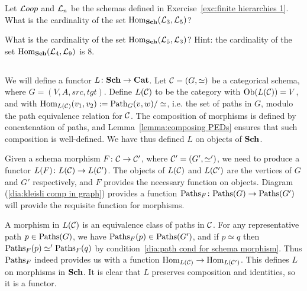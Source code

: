 \documentclass[CT4S-EN-RU]{subfiles}
\begin{document}
\begin{exerciseRUS}\label{exc:finite hierarchies 1}
\end{exerciseRUS}

\begin{exerciseENG}
Let ${\mathcal{L} oop}$ and $\mathcal{L}_n$ be the schemas defined in Exercise~\ref{exc:finite hierarchies 1}.
\sexc What is the cardinality of the set $\textnormal{Hom}_{\mathbf{Sch}}(\mathcal{L}_3,\mathcal{L}_5)$?
\item What is the cardinality of the set $\textnormal{Hom}_{\mathbf{Sch}}(\mathcal{L}_5,\mathcal{L}_3)$? Hint: the cardinality of the set $\textnormal{Hom}_{\mathbf{Sch}}(\mathcal{L}_4,\mathcal{L}_9)$ is 8.
\endsexc
\end{exerciseENG}

\begin{exerciseRUS}
\end{exerciseRUS}


\subsection{}\label{sec:proof of cat=sch}

\begin{constructionENG}
We will define a functor $L\colon{\mathbf{Sch}}\rightarrow{\mathbf{Cat}}$. Let $\mathcal{C}=(G,\simeq)$ be a categorical schema, where $G=(V,A,src,tgt)$. Define $L(\mathcal{C})$ to be the category with $\textnormal{Ob}(L(\mathcal{C}))=V$, and with $\textnormal{Hom}_{L(\mathcal{C})}(v_1,v_2):=\textnormal{Path}_G(v,w)/\simeq$, i.e. the set of paths in $G$, modulo the path equivalence relation for $\mathcal{C}$. The composition of morphisms is defined by concatenation of paths, and Lemma~\ref{lemma:composing PEDs} ensures that such composition is well-defined. We have thus defined $L$ on objects of ${\mathbf{Sch}}$.

Given a schema morphism $F\colon\mathcal{C}\rightarrow\mathcal{C}'$, where $\mathcal{C}'=(G',\simeq')$, we need to produce a functor $L(F)\colon L(\mathcal{C})\rightarrow L(\mathcal{C}')$. The objects of $L(\mathcal{C})$ and $L(\mathcal{C}')$ are the vertices of $G$ and $G'$ respectively, and $F$ provides the necessary function on objects. Diagram (\ref{dia:kleisli comp in graph}) provides a function $\textnormal{Paths}_F\colon\textnormal{Paths}(G)\rightarrow\textnormal{Paths}(G')$ will provide the requisite function for morphisms. 

A morphism in $L(\mathcal{C})$ is an equivalence class of paths in $\mathcal{C}$. For any representative path $p\in\textnormal{Paths}(G)$, we have $\textnormal{Paths}_F(p)\in\textnormal{Paths}(G')$, and if $p\simeq q$ then $\textnormal{Paths}_F(p)\simeq'\textnormal{Paths}_F(q)$ by condition~\ref{dia:path cond for schema morphism}. Thus $\textnormal{Paths}_F$ indeed provides us with a function $\textnormal{Hom}_{L(\mathcal{C})}\rightarrow\textnormal{Hom}_{L(\mathcal{C}')}$. This defines $L$ on morphisms in ${\mathbf{Sch}}$. It is clear that $L$ preserves composition and identities, so it is a functor.
\end{constructionENG}
\end{document}
